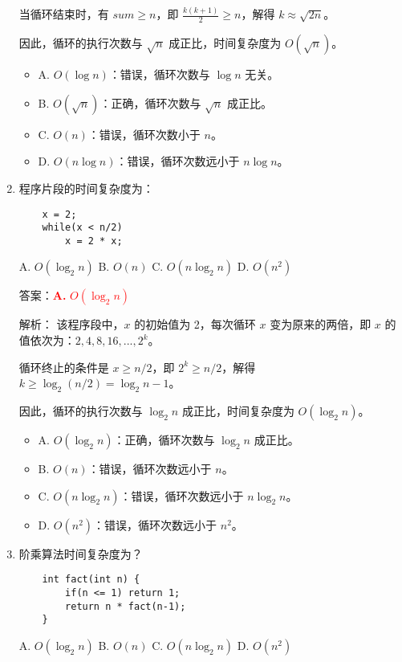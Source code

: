\documentclass[lang=cn,newtx,10pt,scheme=chinese]{../../../elegantbook}
\begin{document}
\begin{enumerate}
    当循环结束时，有 $sum \geq n$，即 $\frac{k(k+1)}{2} \geq n$，解得 $k \approx \sqrt{2n}$。
    
    因此，循环的执行次数与 $\sqrt{n}$ 成正比，时间复杂度为 $O(\sqrt{n})$。

    \begin{itemize}
        \item A. $O(\log n)$：错误，循环次数与 $\log n$ 无关。
        \item B. $O(\sqrt{n})$：正确，循环次数与 $\sqrt{n}$ 成正比。
        \item C. $O(n)$：错误，循环次数小于 $n$。
        \item D. $O(n\log n)$：错误，循环次数远小于 $n\log n$。
    \end{itemize}

    \item 程序片段的时间复杂度为：
    \begin{verbatim}
    x = 2;
    while(x < n/2)
        x = 2 * x;
    \end{verbatim}
    A. $O(\log_2 n)$ \quad B. $O(n)$ \quad C. $O(n \log_2 n)$ \quad D. $O(n^2)$

    答案：\textcolor{red}{\textbf{A.} $O(\log_2 n)$}

    解析：
    该程序段中，$x$ 的初始值为 2，每次循环 $x$ 变为原来的两倍，即 $x$ 的值依次为：$2, 4, 8, 16, ..., 2^k$。
    
    循环终止的条件是 $x \geq n/2$，即 $2^k \geq n/2$，解得 $k \geq \log_2(n/2) = \log_2 n - 1$。
    
    因此，循环的执行次数与 $\log_2 n$ 成正比，时间复杂度为 $O(\log_2 n)$。

    \begin{itemize}
        \item A. $O(\log_2 n)$：正确，循环次数与 $\log_2 n$ 成正比。
        \item B. $O(n)$：错误，循环次数远小于 $n$。
        \item C. $O(n \log_2 n)$：错误，循环次数远小于 $n \log_2 n$。
        \item D. $O(n^2)$：错误，循环次数远小于 $n^2$。
    \end{itemize}

    \item 阶乘算法时间复杂度为？
    \begin{verbatim}
    int fact(int n) {
        if(n <= 1) return 1;
        return n * fact(n-1);
    }
    \end{verbatim}
    A. $O(\log_2 n)$ \quad B. $O(n)$ \quad C. $O(n \log_2 n)$ \quad D. $O(n^2)$


\end{enumerate}
\end{document}
